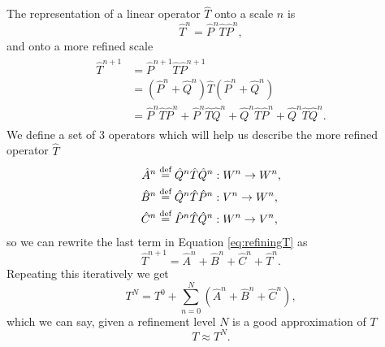\documentclass[../master_thesis.tex]{subfiles}
\begin{document}
The representation of a linear operator $\hat{T}$ onto a scale $n$ is
\begin{equation}\label{eq:PTP}
  \hat{T}^n = \hat{P}^n\hat{T}\hat{P}^n,
\end{equation}
and onto a more refined scale
\begin{align}\label{eq:refiningT}
  \begin{split}
    \hat{T}^{n+1} &= \hat{P}^{n+1}\hat{T}\hat{P}^{n+1}\\
                  &= (\hat{P}^n + \hat{Q}^n)\hat{T}(\hat{P}^n + \hat{Q}^n)\\
                  &= \hat{P}^n\hat{T}\hat{P}^n + \hat{P}^n\hat{T}\hat{Q}^n + \hat{Q}^n\hat{T}\hat{P}^n + \hat{Q}^n\hat{T}\hat{Q}^n.
  \end{split}
\end{align}
We define a set of 3 operators which will help us describe the more refined operator
$\hat{T}$
\begin{align}
  \hat{A}^n & \stackrel{\text{def}}{=}\hat{Q}^n\hat{T}\hat{Q}^n: W^n \to W^n,\\
  \hat{B}^n & \stackrel{\text{def}}{=}\hat{Q}^n\hat{T}\hat{P}^n: V^n \to W^n,\\
  \hat{C}^n & \stackrel{\text{def}}{=}\hat{P}^n\hat{T}\hat{Q}^n: W^n \to V^n,
\end{align}
so we can rewrite the last term in Equation \ref{eq:refiningT} as
\begin{equation}\label{eq:refineT}
  \hat{T}^{n+1} =\hat{A}^n + \hat{B}^n + \hat{C}^n + \hat{T}^n.
\end{equation}
Repeating this iteratively we get
\begin{equation}\label{eq:}
  T^N = T^0 + \sum^N_{n=0}\left( \hat{A}^n + \hat{B}^n + \hat{C}^n\right),
\end{equation}
which we can say, given a refinement level $N$ is a good approximation of $T$
\begin{equation}
  T \approx T^N.
\end{equation}
\end{document}
